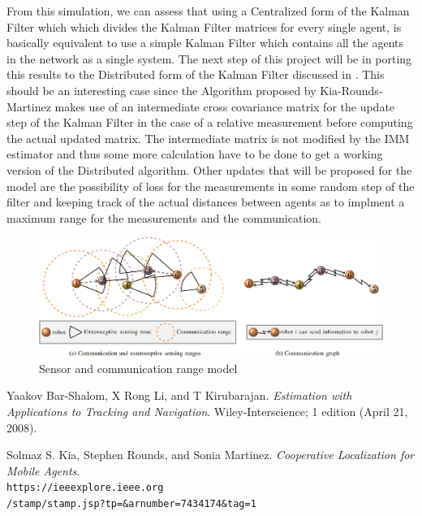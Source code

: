 \documentclass[conference]{IEEEtran}
\begin{document}
From this simulation, we can assess that using a Centralized form of the Kalman Filter which which divides the Kalman Filter matrices for every single agent, is basically equivalent to use a simple Kalman Filter which contains all the agents in the network as a single system.
The next step of this project will be in porting this results to the Distributed form of the Kalman Filter discussed in \cite{Kia-Martinez}. This should be an interesting case since the Algorithm proposed by Kia-Rounds-Martinez makes use of an intermediate cross covariance matrix for the update step of the Kalman Filter in the case of a relative measurement before computing the actual updated matrix. The intermediate matrix is not modified by the IMM estimator and thus some more calculation have to be done to get a working version of the Distributed algorithm. Other updates that will be proposed for the model are the possibility of loss for the measurements in some random step of the filter and keeping track of the actual distances between agents as to implment a maximum range for the measurements and the communication.

\begin{figure}[H]
 \includegraphics[width=\linewidth]{dwg/sensor-range.png}
  \caption{Sensor and communication range model}
\end{figure}

\begin{thebibliography}{9}
Yaakov Bar-Shalom, X Rong Li, and T Kirubarajan. 
\textit{Estimation with Applications to Tracking and Navigation}. 
Wiley-Interscience; 1 edition (April 21, 2008).
 
Solmaz S. Kia, Stephen Rounds, and Sonia Martinez.
\textit{Cooperative Localization for Mobile Agents}. 
\\\texttt{https://ieeexplore.ieee.org\\/stamp/stamp.jsp?tp=\&arnumber=7434174\&tag=1}


\end{thebibliography}
\end{document}
